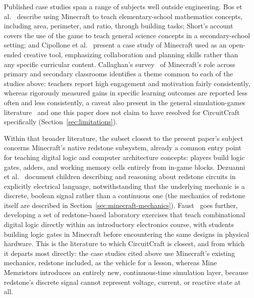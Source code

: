 Published case studies span a range of subjects well outside engineering. Bos et
al.~\cite{bos2014mathematics} describe using Minecraft to teach elementary-school
mathematics concepts, including area, perimeter, and ratio, through building tasks; Short's
account~\cite{short2012teaching} covers the use of the game to teach general science concepts
in a secondary-school setting; and Cipollone et al.~\cite{cipollone2014creative} present a
case study of Minecraft used as an open-ended creative tool, emphasizing collaboration and
planning skills rather than any specific curricular content. Callaghan's
survey~\cite{callaghan2016investigating} of Minecraft's role across primary and secondary
classrooms identifies a theme common to each of the studies above: teachers report high
engagement and motivation fairly consistently, whereas rigorously measured gains in specific
learning outcomes are reported less often and less consistently, a caveat also present in
the general simulation-games literature~\cite{sitzmann2011meta} and one this paper does not
claim to have resolved for CircuitCraft specifically (Section~\ref{sec:limitations}).

Within that broader literature, the subset closest to the present paper's subject concerns
Minecraft's native redstone subsystem, already a common entry point for teaching digital
logic and computer architecture concepts: players build logic gates, adders, and working
memory cells entirely from in-game blocks. Dezuanni et al.~\cite{dezuanni2015redstone}
document children describing and reasoning about redstone circuits in explicitly electrical
language, notwithstanding that the underlying mechanic is a discrete, boolean signal rather
than a continuous one (the mechanics of redstone itself are described in
Section~\ref{sec:minecraft-mechanics}). Faust~\cite{faust2024minecraft} goes further,
developing a set of redstone-based laboratory exercises that teach combinational digital
logic directly within an introductory electronics course, with students building logic gates
in Minecraft before encountering the same designs in physical hardware. This is the
literature to which CircuitCraft is
closest, and from which it departs most directly: the case studies cited above use
Minecraft's existing mechanics, redstone included, as the vehicle for a lesson, whereas Mine
Memristors introduces an entirely new, continuous-time simulation layer, because redstone's
discrete signal cannot represent voltage, current, or reactive state at all.

